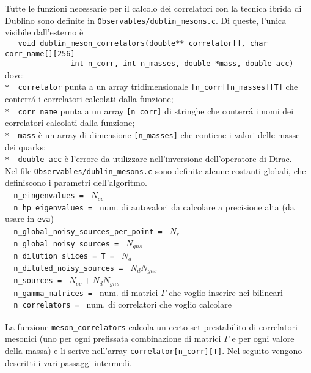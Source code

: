 \documentclass[a4paper]{article}
\begin{document}
Tutte le funzioni necessarie per il calcolo dei correlatori con la tecnica ibrida di Dublino sono definite in \verb|Observables/dublin_mesons.c|. Di queste, l'unica visibile dall'esterno \`{e} \\
\verb|   void dublin_meson_correlators(double** correlator[], char corr_name[][256]|\\
\verb|               int n_corr, int n_masses, double *mass, double acc)|\\
dove:\\
\verb|*  correlator| punta a un array tridimensionale \verb|[n_corr][n_masses][T]| che conterr\'{a} i correlatori calcolati dalla funzione;\\
\verb|*  corr_name| punta a un array \verb|[n_corr]| di stringhe che conterr\'{a} i nomi dei correlatori calcolati dalla funzione;\\
\verb|*  mass| \`{e} un array di dimensione \verb|[n_masses]| che contiene i valori delle masse dei quarks;\\
\verb|*  double acc| \`{e} l'errore da utilizzare nell'inversione dell'operatore di Dirac.
\verb| |\\

Nel file \verb|Observables/dublin_mesons.c| sono definite alcune costanti globali, che definiscono i parametri dell'algoritmo.\\
\verb|  n_eingenvalues = | $ N_{ev}$\\
\verb|  n_hp_eigenvalues = | num. di autovalori da calcolare a precisione alta (da usare in \verb|eva|)\\
\verb|  n_global_noisy_sources_per_point = | $ N_r $\\
\verb|  n_global_noisy_sources = | $ N_{gns} $\\
\verb|  n_dilution_slices = T = | $ N_d $\\
\verb|  n_diluted_noisy_sources = | $ N_d N_{gns} $\\
\verb|  n_sources = | $N_{ev} + N_d N_{gns}$ \\
\verb|  n_gamma_matrices = | num. di matrici $\Gamma$ che voglio inserire nei bilineari\\
\verb|  n_correlators = | num. di correlatori che voglio calcolare\\
\verb| |\\

La funzione \verb|meson_correlators| calcola un certo set prestabilito di correlatori mesonici (uno per ogni prefissata combinazione di matrici $\Gamma$ e per ogni valore della massa) e li scrive nell'array \verb|correlator[n_corr][T]|. Nel seguito vengono descritti i vari passaggi intermedi.
\end{document}
